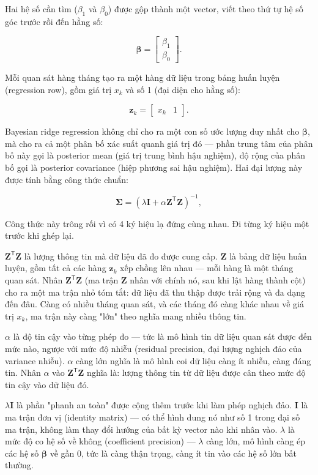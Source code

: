 \documentclass[12pt]{article}
\begin{document}
Hai hệ số cần tìm ($\beta_1$ và $\beta_0$) được gộp thành một vector, viết theo thứ tự hệ số góc trước rồi đến hằng số:

\[
\boldsymbol{\beta}
=
\begin{bmatrix}
\beta_1\\
\beta_0
\end{bmatrix}.
\]

Mỗi quan sát hàng tháng tạo ra một hàng dữ liệu trong bảng huấn luyện (regression row), gồm giá trị $x_k$ và số 1 (đại diện cho hằng số):

\[
\boldsymbol{z}_k
=
\begin{bmatrix}
x_k & 1
\end{bmatrix}.
\]

Bayesian ridge regression không chỉ cho ra một con số ước lượng duy nhất cho $\boldsymbol{\beta}$, mà cho ra cả một phân bố xác suất quanh giá trị đó — phần trung tâm của phân bố này gọi là posterior mean (giá trị trung bình hậu nghiệm), độ rộng của phân bố gọi là posterior covariance (hiệp phương sai hậu nghiệm). Hai đại lượng này được tính bằng công thức chuẩn:

\[
\boldsymbol{\Sigma}
=
\left(
\lambda\boldsymbol{I}
+
\alpha\boldsymbol{Z}^{\mathsf{T}}\boldsymbol{Z}
\right)^{-1},
\]

Công thức này trông rối vì có 4 ký hiệu lạ đứng cùng nhau. Đi từng ký hiệu một trước khi ghép lại.

$\boldsymbol{Z}^{\mathsf{T}}\boldsymbol{Z}$ là lượng thông tin mà dữ liệu đã đo được cung cấp. $\boldsymbol{Z}$ là bảng dữ liệu huấn luyện, gồm tất cả các hàng $\boldsymbol{z}_k$ xếp chồng lên nhau — mỗi hàng là một tháng quan sát. Nhân $\boldsymbol{Z}^{\mathsf{T}}\boldsymbol{Z}$ (ma trận $\boldsymbol{Z}$ nhân với chính nó, sau khi lật hàng thành cột) cho ra một ma trận nhỏ tóm tắt: dữ liệu đã thu thập được trải rộng và đa dạng đến đâu. Càng có nhiều tháng quan sát, và các tháng đó càng khác nhau về giá trị $x_k$, ma trận này càng "lớn" theo nghĩa mang nhiều thông tin.

$\alpha$ là độ tin cậy vào từng phép đo — tức là mô hình tin dữ liệu quan sát được đến mức nào, ngược với mức độ nhiễu (residual precision, đại lượng nghịch đảo của variance nhiễu). $\alpha$ càng lớn nghĩa là mô hình coi dữ liệu càng ít nhiễu, càng đáng tin. Nhân $\alpha$ vào $\boldsymbol{Z}^{\mathsf{T}}\boldsymbol{Z}$ nghĩa là: lượng thông tin từ dữ liệu được cân theo mức độ tin cậy vào dữ liệu đó.

$\lambda\boldsymbol{I}$ là phần "phanh an toàn" được cộng thêm trước khi làm phép nghịch đảo. $\boldsymbol{I}$ là ma trận đơn vị (identity matrix) — có thể hình dung nó như số 1 trong đại số ma trận, không làm thay đổi hướng của bất kỳ vector nào khi nhân vào. $\lambda$ là mức độ co hệ số về không (coefficient precision) — $\lambda$ càng lớn, mô hình càng ép các hệ số $\boldsymbol{\beta}$ về gần 0, tức là càng thận trọng, càng ít tin vào các hệ số lớn bất thường.
\end{document}
